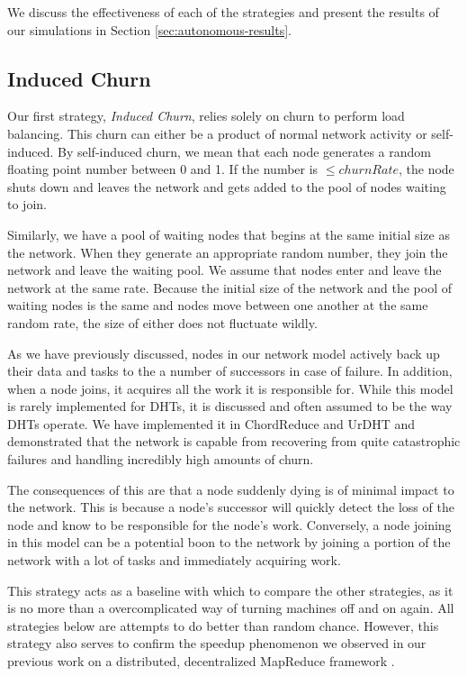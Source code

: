 \documentclass[11pt,letterpaper]{article}
\begin{document}
We discuss the effectiveness of each of the strategies and present the results of our simulations in Section \ref{sec:autonomous-results}.



\subsection{Induced Churn}
\label{sec:strat-churn}
Our first strategy, \textit{Induced Churn}, relies solely on churn to perform load balancing.
This churn can either be a product of normal network activity or self-induced.
By self-induced churn, we mean that each node generates a random floating point number between 0 and 1.
If the number is $\leq churnRate$, the node shuts down and leaves the network and gets added to the pool of nodes waiting to join.

Similarly, we have a pool of waiting nodes that begins at the same initial size as the network.
When they generate an appropriate random number, they join the network and leave the waiting pool.
We assume that nodes enter and leave the network at the same rate.
Because the initial size of the network and the pool of waiting nodes is the same and nodes move between one another at the same random rate, the size of either does not fluctuate wildly.

As we have previously discussed, nodes in our network model actively back up their data and tasks to the a number of successors in case of failure.
In addition, when a node joins, it acquires all the work it is responsible for.
While this model is rarely implemented for DHTs, it is discussed \cite{kademlia} and often assumed to be the way DHTs operate. 
We have implemented it in ChordReduce\cite{chordreduce} and UrDHT\cite{urdht} and demonstrated that the network is capable from recovering from quite catastrophic failures and handling incredibly high amounts of churn.

The consequences of this are that a node suddenly dying is of minimal impact to the network.
This is because a node's successor will quickly detect the loss of the node and know to be responsible for the node's work.
Conversely, a node joining in this model can be a potential boon to the network by joining a portion of the network with a lot of tasks and immediately acquiring work.

This strategy acts as a baseline with which to compare the other strategies, as it is no more than a overcomplicated way of turning machines off and on again. 
All strategies below are attempts to do better than random chance.
However, this strategy also serves to confirm the speedup phenomenon we observed in our previous work on a distributed, decentralized MapReduce framework \cite{chordreduce}.
\end{document}
